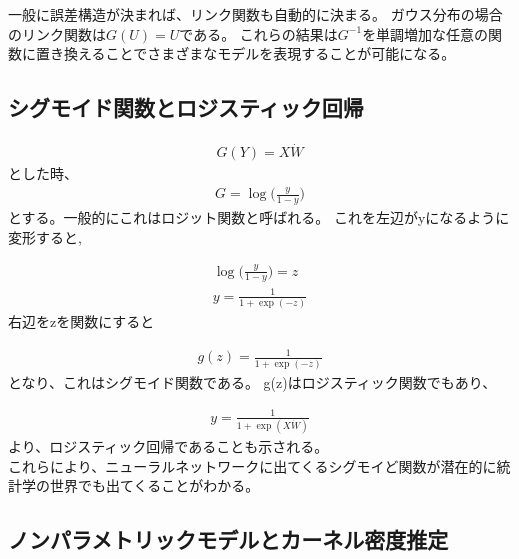 一般に誤差構造が決まれば、リンク関数も自動的に決まる。
ガウス分布の場合のリンク関数は$ G(U) = U $である。
これらの結果は$ G^{-1} $を単調増加な任意の関数に置き換えることでさまざまなモデルを表現することが可能になる。


\subsection{シグモイド関数とロジスティック回帰}
\begin{eqnarray}
G(Y)=X\dot W
\end{eqnarray}
とした時、
\begin{eqnarray}
G=\log \bigl(\frac{y}{1-y}\bigr)
\end{eqnarray}
とする。一般的にこれはロジット関数と呼ばれる。
これを左辺がyになるように変形すると,

\begin{eqnarray}
\log \bigl(\frac{y}{1-y}\bigr) = z \\
y = \frac{1}{1 + \exp(-z)}
\end{eqnarray}
右辺をzを関数にすると

\begin{eqnarray}
g(z) = \frac{1}{1 + \exp(-z)}
\end{eqnarray}
となり、これはシグモイド関数である。
g(z)はロジスティック関数でもあり、


\begin{eqnarray}
y = \frac{1}{1 + \exp (X \dot W)}
\end{eqnarray}
より、ロジスティック回帰であることも示される。 \\

これらにより、ニューラルネットワークに出てくるシグモイど関数が潜在的に統計学の世界でも出てくることがわかる。







\subsection{ノンパラメトリックモデルとカーネル密度推定}

